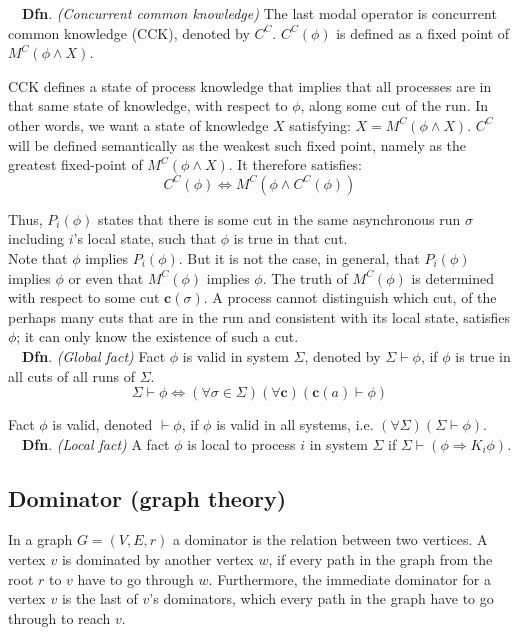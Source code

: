 \documentclass{article}
\newcommand{\dfnn}[2]{$\quad$\textbf{Dfn}. \emph{(#1)} {#2}}
\renewcommand{\vec}[1]{\mathbf{#1}}
\begin{document}
\dfnn{Concurrent common knowledge}{The last modal operator is concurrent common knowledge (CCK), denoted by $C^C$. $C^C(\phi)$ is defined as a fixed point of $M^C(\phi \wedge X)$.}

CCK defines a state of process knowledge that implies that all processes are in that same state of knowledge, with respect to $\phi$, along some cut of the run. In other words, we want a state of knowledge $X$ satisfying: $X = M^C(\phi \wedge X)$.	
$C^C$ will be defined semantically as the weakest such fixed point, namely as the greatest fixed-point of $M^C(\phi \wedge X)$.
It therefore satisfies:
$$C^C(\phi) \Leftrightarrow  M^C(\phi \wedge C^C(\phi))$$

Thus, $P_i(\phi)$ states that there is some cut in the same asynchronous run $\sigma$ including $i$’s local state, such that $\phi$ is true in that cut.\\

Note that $\phi$ implies $P_i(\phi)$. But it is not the case, in general, that $P_i(\phi)$ implies $\phi$ or even that $M^C(\phi)$ implies $\phi$. The truth of $M^C(\phi)$ is determined with respect to some cut $\vec{c}(\sigma)$. A process cannot distinguish which cut, of the perhaps many cuts that are in the run and consistent with its local state, satisfies $\phi$; it can only know the existence of such a cut.\\ 

\dfnn{Global fact}{Fact $\phi$ is valid in system $\Sigma$, denoted by $\Sigma \vdash \phi$, if $\phi$ is true in all cuts of all runs of $\Sigma$.
	$$\Sigma \vdash \phi 
	\Leftrightarrow (\forall \sigma \in \Sigma)(\forall\vec{c}) (\vec{c}(a) \vdash \phi)$$}
	
Fact $\phi$ is valid, denoted $\vdash \phi$, if $\phi$ is valid in all systems, i.e. 
	$(\forall \Sigma) (\Sigma \vdash \phi)$.\\

\dfnn{Local fact}{A fact $\phi$ is local to process $i$ in system $\Sigma$ if
	 $\Sigma \vdash (\phi \Rightarrow K_i \phi)$.}

\subsection{Dominator (graph theory)}

In a graph $G=(V, E, r)$ a dominator is the relation between two vertices. A vertex $v$ is dominated by another vertex $w$, if every path in the graph from the root $r$ to $v$ have to go through $w$. Furthermore, the immediate dominator for a vertex $v$ is the last of $v$’s dominators, which every path in the graph have to go through to reach $v$.
\end{document}
